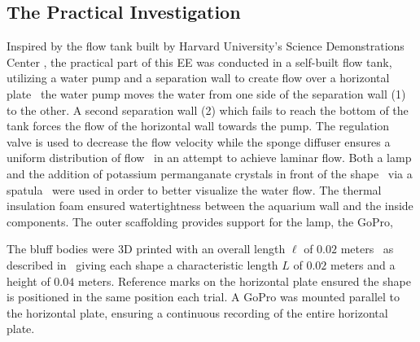 \subsection{The Practical Investigation}
Inspired by the flow tank built by Harvard University’s Science Demonstrations Center \parencite{noauthor_vortex_nodate}, the practical part of this EE was conducted in a self-built flow tank, utilizing a water pump and a separation wall to create flow over a horizontal plate \textemdash\ the water pump moves the water from one side of the separation wall (1) to the other. A second separation wall (2) which fails to reach the bottom of the tank forces the flow of the horizontal wall towards the pump. The regulation valve is used to decrease the flow velocity while the sponge diffuser ensures a uniform distribution of flow \textemdash\ in an attempt to achieve laminar flow. Both a lamp and the addition of potassium permanganate crystals in front of the shape \textemdash\ via a spatula \textemdash\ were used in order to better visualize the water flow. The thermal insulation foam ensured watertightness between the aquarium wall and the inside components. The outer scaffolding provides support for the lamp, the GoPro, 

The bluff bodies were 3D printed with an overall length $\ell$ of $0.02$ meters \textemdash\ as described in  \textemdash\ giving each shape a characteristic length $L$ of $0.02$ meters and a height of $0.04$ meters. Reference marks on the horizontal plate ensured the shape is positioned in the same position each trial. A GoPro was mounted parallel to the horizontal plate, ensuring a continuous recording of the entire horizontal plate.

